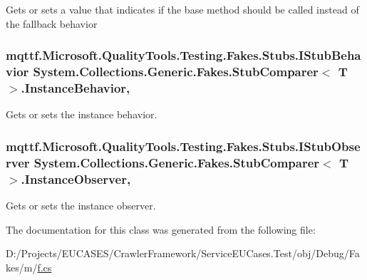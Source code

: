 Gets or sets a value that indicates if the base method should be called instead of the fallback behavior

\hypertarget{class_system_1_1_collections_1_1_generic_1_1_fakes_1_1_stub_comparer_3_01_t_01_4_adba214d694e3db6f223903153a7d7902}{
\subsubsection[{Instance\-Behavior}]{\setlength{\rightskip}{0pt plus 5cm}mqttf.\-Microsoft.\-Quality\-Tools.\-Testing.\-Fakes.\-Stubs.\-I\-Stub\-Behavior System.\-Collections.\-Generic.\-Fakes.\-Stub\-Comparer$<$ T $>$.Instance\-Behavior\hspace{0.3cm}{\ttfamily [get]}, {\ttfamily [set]}}}\label{class_system_1_1_collections_1_1_generic_1_1_fakes_1_1_stub_comparer_3_01_t_01_4_adba214d694e3db6f223903153a7d7902}


Gets or sets the instance behavior.

\hypertarget{class_system_1_1_collections_1_1_generic_1_1_fakes_1_1_stub_comparer_3_01_t_01_4_a1917545232137e19036d26136cda3460}{
\subsubsection[{Instance\-Observer}]{\setlength{\rightskip}{0pt plus 5cm}mqttf.\-Microsoft.\-Quality\-Tools.\-Testing.\-Fakes.\-Stubs.\-I\-Stub\-Observer System.\-Collections.\-Generic.\-Fakes.\-Stub\-Comparer$<$ T $>$.Instance\-Observer\hspace{0.3cm}{\ttfamily [get]}, {\ttfamily [set]}}}\label{class_system_1_1_collections_1_1_generic_1_1_fakes_1_1_stub_comparer_3_01_t_01_4_a1917545232137e19036d26136cda3460}


Gets or sets the instance observer.



The documentation for this class was generated from the following file\-:\begin{DoxyCompactItemize}
\item 
D\-:/\-Projects/\-E\-U\-C\-A\-S\-E\-S/\-Crawler\-Framework/\-Service\-E\-U\-Cases.\-Test/obj/\-Debug/\-Fakes/m/\hyperlink{m_2f_8cs}{f.\-cs}\end{DoxyCompactItemize}
